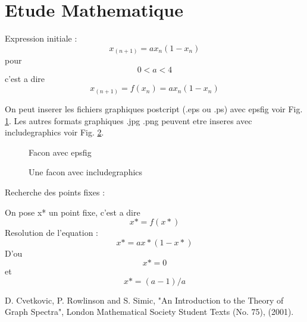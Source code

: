 \documentclass{article}
\begin{document}
\section{Etude Mathematique}

     Expression initiale : $$x_(n+1) = ax_n(1 - x_n)$$ pour  $$0 < a < 4$$
  c'est a dire $$x_(n+1) = f(x_n) = ax_n(1 - x_n)$$

On peut inserer les fichiers graphiques postcript (.eps ou .ps) avec
epsfig voir Fig. \ref{fig1}. Les autres formats graphiques .jpg .png
peuvent etre inseres avec includegraphics  voir Fig. \ref{fig2}.

\begin{figure} [H] \label{fig1}
\centerline{}
\caption{Facon avec epsfig}
\end{figure}

\begin{figure} [H]
\centering
{}
  \caption{Une facon avec includegraphics}
  \label{fig2}
\end{figure}



 Recherche des points fixes :

  On pose x* un point fixe, c'est a dire $$x* = f(x*)$$
  Resolution de l'equation : $$x* = ax*(1 - x*) $$
  D'ou $$x* = 0$$ et $$x* = (a - 1)/a$$


\begin{thebibliography}{99}


 D. Cvetkovic, P. Rowlinson and S. Simic,
 "An Introduction to the Theory of
Graph Spectra",  London Mathematical Society Student Texts (No. 75), (2001).
\end{thebibliography}
\end{document}

